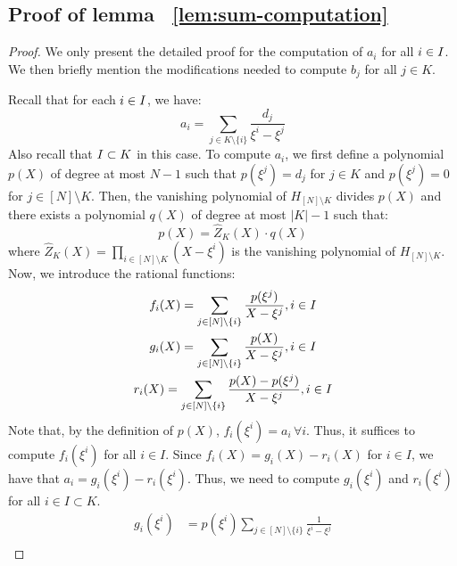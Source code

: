 \subsection{Proof of lemma ~\ref{lem:sum-computation}}\label{subsec:sum-computation}

\begin{proof}

    We only present the detailed proof for the computation of $a_i$ for all $i \in I$. We then briefly mention the modifications needed to compute $b_j$ for all $j \in K$.
    
    \smallskip
    
     Recall that for each $i \in I$, we have:
    \begin{equation}\label{eq:ei}
    a_i = \sum_{j\in K\setminus \{i\}} \frac{d_j}{\xi^i - \xi^j}
    \end{equation}
    Also recall that $I \subset K$ in this case.
    To compute $a_i$, we first define a polynomial $p(X)$ of degree at most $N-1$ such that
    $p(\xi^j)=d_j$ for $j\in K$ and $p(\xi^j)=0$ for $j \in [N]\setminus K$.
    Then, the vanishing polynomial of $H_{[N]\setminus K}$ divides $p(X)$ and
    there exists a polynomial $q(X)$ of degree at most $|K|-1$ such that:
    \begin{equation}\label{eq:px}
    p(X) = \hat{Z}_K(X)\cdot q(X)
    \end{equation}
    where $\hat{Z}_K(X)=\prod_{i\in [N]\setminus K}(X-\xi^i)$ is the vanishing polynomial of $H_{[N]\setminus K}$. Now, we introduce the rational functions:
    \begin{gather}\label{eq:fgr}
    f_i(X) = \sum_{j\in [N]\setminus \{i\}}\frac{p(\xi^j)}{X-\xi^j}, i\in \setind \\
    g_i(X) = \sum_{j\in [N]\setminus \{i\}}\frac{p(X)}{X-\xi^j}, i\in \setind \\
    r_i(X) = \sum_{j\in [N]\setminus \{i\}}\frac{p(X) - p(\xi^j)}{X-\xi^j}, i\in \setind
    \end{gather}
    Note that, by the definition of $p(X)$, $f_i(\xi^i)=a_i \,\forall i$. Thus, it suffices to compute $f_i(\xi^i)$ for all $i \in I$. Since $f_i(X) = g_i(X) - r_i(X)$ for $i\in I$, we have that
    $a_i=g_i(\xi^i)-r_i(\xi^i)$.
    Thus, we need to compute $g_i(\xi^i)$ and $r_i(\xi^i)$ for all $i \in I \subset K$.
    \begin{align*}
        g_i(\xi^i) &= p(\xi^i)\sum_{j\in [N]\setminus \{i\}} \frac{1}{\xi^i-\xi^j} \\

\end{align*}
\end{proof}
